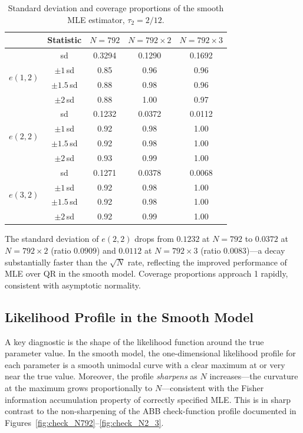 \documentclass[12pt]{article}
\begin{document}
\begin{table}[H]
\centering
\caption{Standard deviation and coverage proportions of the smooth MLE estimator,
$\tau_2=2/12$.}
\label{tab:smooth_sd_tau2}
\begin{tabular}{lcccc}
\toprule
 & Statistic & $N=792$ & $N=792\times2$ & $N=792\times3$ \\
\midrule
\multirow{4}{*}{$e(1,2)$}
 & sd           & 0.3294 & 0.1290 & 0.1692 \\
 & $\pm1\,$sd   & 0.85   & 0.96   & 0.96   \\
 & $\pm1.5\,$sd & 0.88   & 0.98   & 0.96   \\
 & $\pm2\,$sd   & 0.88   & 1.00   & 0.97   \\
\midrule
\multirow{4}{*}{$e(2,2)$}
 & sd           & 0.1232 & 0.0372 & 0.0112 \\
 & $\pm1\,$sd   & 0.92   & 0.98   & 1.00   \\
 & $\pm1.5\,$sd & 0.92   & 0.98   & 1.00   \\
 & $\pm2\,$sd   & 0.93   & 0.99   & 1.00   \\
\midrule
\multirow{4}{*}{$e(3,2)$}
 & sd           & 0.1271 & 0.0378 & 0.0068 \\
 & $\pm1\,$sd   & 0.92   & 0.98   & 1.00   \\
 & $\pm1.5\,$sd & 0.92   & 0.98   & 1.00   \\
 & $\pm2\,$sd   & 0.92   & 0.99   & 1.00   \\
\bottomrule
\end{tabular}
\end{table}

\noindent
The standard deviation of $e(2,2)$ drops from $0.1232$ at $N=792$ to
$0.0372$ at $N=792\times2$ (ratio $0.0909$) and $0.0112$ at $N=792\times3$
(ratio $0.0083$)---a decay substantially faster than the $\sqrt{N}$ rate,
reflecting the improved performance of MLE over QR in the smooth model.
Coverage proportions approach 1 rapidly, consistent with asymptotic normality.

\subsection{Likelihood Profile in the Smooth Model}

A key diagnostic is the shape of the likelihood function around the true
parameter value.
In the smooth model, the one-dimensional likelihood profile for each parameter
is a smooth unimodal curve with a clear maximum at or very near the true value.
Moreover, the profile \emph{sharpens} as $N$ increases---the curvature at the
maximum grows proportionally to $N$---consistent with the Fisher information
accumulation property of correctly specified MLE.
This is in sharp contrast to the non-sharpening of the ABB check-function
profile documented in Figures~\ref{fig:check_N792}--\ref{fig:check_N2_3}.
\end{document}
